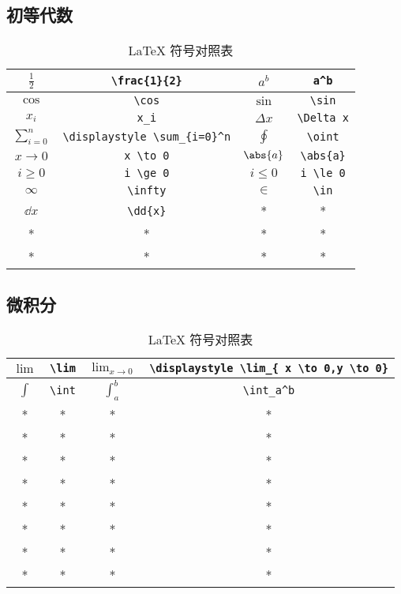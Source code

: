 

\begin{issues}
\issueDraft
\end{issues}

\subsection{初等代数}
\begin{table}[ht]
\centering
\caption{LaTeX 符号对照表}\label{tab_TeXSym0}
\begin{tabular}{|c|c|c|c|}
\hline
$\frac{1}{2}$ & \verb`\frac{1}{2}` & $a^b$ & \verb`a^b` \\
\hline
$\cos$ & \verb`\cos` & $\sin$ & \verb`\sin` \\
\hline
$x_i$ & \verb`x_i` & $\Delta x$& \verb`\Delta x` \\
\hline
$\displaystyle \sum_{i=0}^n$ & \verb`\displaystyle \sum_{i=0}^n` & $\oint$ & \verb`\oint` \\
\hline
$x \to 0$ & \verb`x \to 0` & $\abs{a}$ & \verb`\abs{a}` \\
\hline
$i \ge 0$& \verb`i \ge 0` & $i \le 0$ & \verb`i \le 0` \\
\hline
$\infty$ & \verb`\infty` & $\in$ & \verb`\in` \\
\hline
$\dd{x}$ & \verb`\dd{x}` & * & * \\
\hline
* & * & * & * \\
\hline
* & * & * & * \\
\hline
\end{tabular}
\end{table}


\subsection{微积分}
\begin{table}[ht]
\centering
\caption{LaTeX 符号对照表}\label{tab_TeXSym1}
\begin{tabular}{|c|c|c|c|}
\hline
$\lim$ & \verb`\lim` & $\displaystyle \lim_{x \to 0}$ & \verb`\displaystyle \lim_{ x \to 0,y \to 0}` \\
\hline
$\int$ & \verb`\int` & $\int_a^b$ & \verb`\int_a^b` \\
\hline
* & * & * & * \\
\hline
* & * & * & * \\
\hline
* & * & * & * \\
\hline
* & * & * & * \\
\hline
* & * & * & * \\
\hline
* & * & * & * \\
\hline
* & * & * & * \\
\hline
* & * & * & * \\
\hline
\end{tabular}
\end{table}
